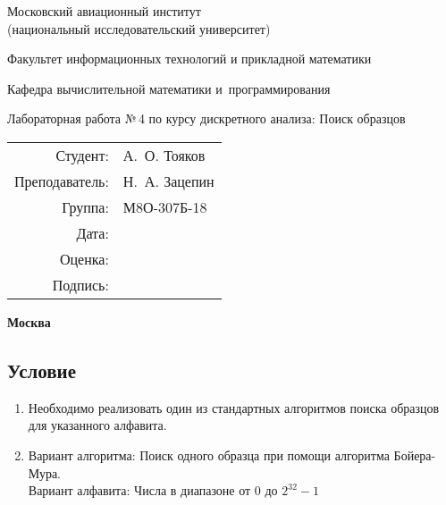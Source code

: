 \documentclass[12pt]{article}
\begin{document}
\thispagestyle{empty}
\begin{center}
	\bfseries

	{\Large Московский авиационный институт\\ (национальный исследовательский университет)

	}

	\vspace{48pt}

	{\large Факультет информационных технологий и прикладной математики
	}

	\vspace{36pt}


	{\large Кафедра вычислительной математики и~программирования

	}


	\vspace{48pt}

	{Лабораторная работа №\,4 по курсу дискретного анализа: Поиск образцов}

\end{center}

\vspace{72pt}

\begin{flushright}
	\begin{tabular}{rl}
		Студент:       & А.\, О. Тояков   \\
		Преподаватель: & Н.\, А. Зацепин \\
		Группа:        & М8О-307Б-18      \\
		Дата:          &                 \\
		Оценка:        &                  \\
		Подпись:       &                  \\
	\end{tabular}
\end{flushright}

\vfill

\begin{center}
	\bfseries
	Москва\\
	\the\year
\end{center}

\newpage

\subsection*{Условие}

\begin{enumerate}
\item Необходимо реализовать один из стандартных алгоритмов поиска образцов для указанного алфавита.
\item Вариант алгоритма: Поиск одного образца при помощи алгоритма Бойера-Мура.
\\
Вариант алфавита: Числа в диапазоне от 0 до $2^{32} - 1$
\end{enumerate}
\end{document}
